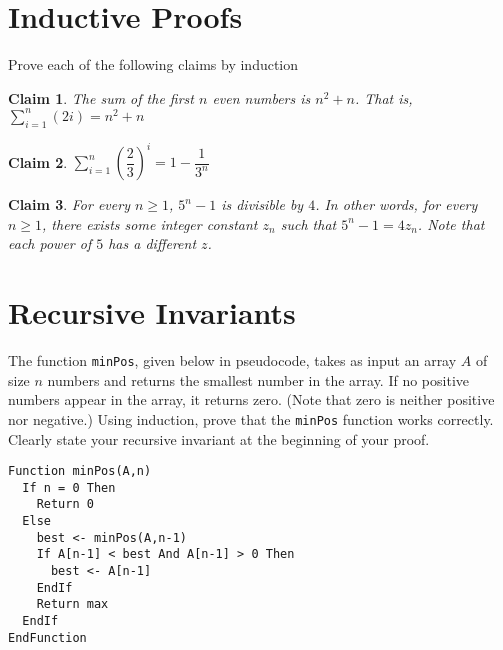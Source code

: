 \documentclass{article}
\newtheorem{claim}{Claim}
\begin{document}
    \section{Inductive Proofs}

    Prove each of the following claims by induction

    \begin{claim}
      The sum of the first $n$ even numbers is $n^2+n$.  That is, $\sum\limits_{i=1}^n (2i) = n^2+n$
    \end{claim}



    \begin{claim}
      $\sum\limits_{i=1}^{n} \left(\dfrac{2}{3}\right)^i = 1 - \dfrac{1}{3^n}$
    \end{claim}



    \begin{claim}
      For every $n \geq 1$, $5^n - 1$ is divisible by $4$.  In other words, for every $n \geq 1$, there exists some integer constant $z_n$ such that $5^n - 1 = 4z_n$.  Note that each power of $5$ has a different $z$.
    \end{claim}



    \vspace{1cm}
    \section{Recursive Invariants}

    The function \texttt{minPos}, given below in pseudocode, takes as input an array $A$ of size $n$ numbers and returns the smallest  number in the array.  If no positive numbers appear in the array, it returns zero.  (Note that zero is neither positive nor negative.)  Using induction, prove that the \texttt{minPos} function works correctly.  Clearly state your recursive invariant at the beginning of your proof.

    \begin{verbatim}
Function minPos(A,n)
  If n = 0 Then
    Return 0
  Else
    best <- minPos(A,n-1)
    If A[n-1] < best And A[n-1] > 0 Then
      best <- A[n-1]
    EndIf
    Return max
  EndIf
EndFunction
    \end{verbatim}

\end{document}
